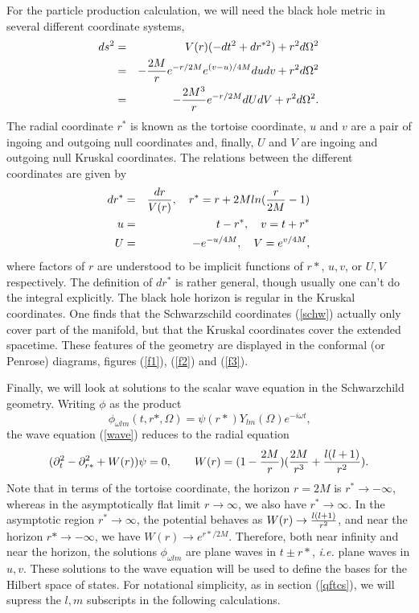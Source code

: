 \documentclass[12pt]{article}
\newcommand{\be}{\begin{equation}}
\newcommand{\ee}{\end{equation}}
\def\bena{\begin{eqnarray}}
\def\eena{\end{eqnarray}}
\begin{document}
For the particle production calculation, we will need the black hole metric
in several
different coordinate systems,
%
\bena\label{other} ds^2 &= &V(r)( -dt^2 + dr^{*2} ) + r^2 d\Omega ^2 \\
&=& -{2M\over r} e^{-r/2M} e^{(v-u)/4M} dudv    +r^2 d\Omega ^2 \\
& =& -{2M^3 \over r} e^{-r/2M}dU dV  +r^2 d\Omega ^2.\eena
%
The radial coordinate $r^*$ is known as the tortoise coordinate, $u$ and
$v$ are a
pair of ingoing and outgoing null coordinates and, finally, $U$ and $V$ are
ingoing and
outgoing null Kruskal coordinates.  The relations between the different
coordinates are
given by
%
\bena\label{coordtrans}
 dr^* &=& {dr\over V(r) },\quad r^*=r +2M ln ({r\over 2M}-1) \\
u &= &t-r^* ,\quad v=t+r^* \\
U &= &-e^{-u/4M} ,\quad  V=e^{v/4M} ,\eena
%
where factors of $r$ are understood to be implicit functions of $r*$,
$u,v$, or $U,V$ respectively. The definition of $dr^*$ is rather general,
though usually
one can't do the integral explicitly.
The black hole horizon is regular in the  Kruskal coordinates.
One finds that the Schwarzschild  coordinates (\ref{schw}) actually only
cover part of the
manifold, but that the Kruskal coordinates cover the extended  spacetime.
These features of the geometry are displayed in the conformal (or Penrose)
diagrams, figures (\ref{f1}), (\ref{f2}) and (\ref{f3}).

Finally, we will look at solutions to the scalar wave equation in the
Schwarzchild geometry.  Writing $\phi$ as the product
%
\be\label{separate}\,\phi _{\omega lm} (t,r*,\Omega )=\psi (r*) Y_{lm}(\Omega)
e^{-i\omega t},\ee
%
the wave equation (\ref{wave})  reduces to the radial equation
%
\be\label{waveschw} (\partial ^2 _t  -\partial ^2 _{r*} +W(r) )\psi =0,
\qquad W(r) =(1- {2M\over r}) ({2M\over r^3 } +{l(l+1)\over r^2} ).\ee
%
Note that in terms of the tortoise coordinate, the horizon $r=2M$ is
$r^*\rightarrow
-\infty$, whereas in the asymptotically flat limit $r\rightarrow\infty$, we
also have
$r^*\rightarrow\infty$.
In the asymptotic region $r^*\rightarrow\infty$, the potential behaves as
$W(r)\rightarrow
{l(l+1)\over r^2}$, and near the horizon $r*\rightarrow -\infty$, we have
$W(r)\rightarrow e^{r*/2M}$.  Therefore, both near infinity and near the
horizon, the
solutions $\phi _{\omega lm}$ are plane waves in $t\pm r*$, {\it i.e.}
plane waves in $u,v$.
These solutions to the wave equation will be used to define the bases for
the Hilbert
space of states. For notational simplicity, as in section (\ref{qftcs}), we will
supress the $l,m$
subscripts in the following calculations.
\end{document}
